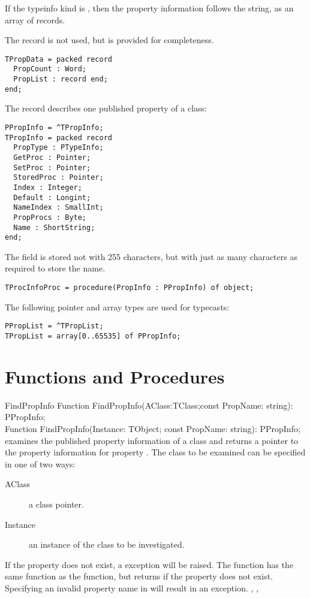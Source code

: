 If the typeinfo kind is , then the property 
information follows the  string, as an array of  records.

The  record is not used, but is provided for completeness.
\begin{verbatim}
TPropData = packed record
  PropCount : Word;
  PropList : record end;
end;
\end{verbatim}
The  record describes one published property of a class:
\begin{verbatim}
PPropInfo = ^TPropInfo;
TPropInfo = packed record
  PropType : PTypeInfo;
  GetProc : Pointer;
  SetProc : Pointer;
  StoredProc : Pointer;
  Index : Integer;
  Default : Longint;
  NameIndex : SmallInt;
  PropProcs : Byte;
  Name : ShortString;
end;
\end{verbatim}
The  field is stored not with 255 characters, but with just as many characters
as required to store the name.
\begin{verbatim}
TProcInfoProc = procedure(PropInfo : PPropInfo) of object;
\end{verbatim}
The following pointer and array types are used for typecasts:
\begin{verbatim}
PPropList = ^TPropList;
TPropList = array[0..65535] of PPropInfo;
\end{verbatim}

\section{Functions and Procedures}

\begin{function}{FindPropInfo}
\Declaration
Function FindPropInfo(AClass:TClass;const PropName: string): PPropInfo;\\
Function FindPropInfo(Instance: TObject; const PropName: string): PPropInfo;   
\Description
{} examines the published property information of a class and
returns a pointer to the property information for property .
The class to be examined can be specified in one of two ways:
\begin{description}
\item[AClass] a class pointer.
\item[Instance] an instance of the class to be investigated.
\end{description}
If the property does not exist, a  exception will be
raised. The  function has the same function as the
 function, but returns  if the property does not
exist.
\Errors
Specifying an invalid property name in  will result in an
 exception.
\SeeAlso
{}, , 
\end{function}

